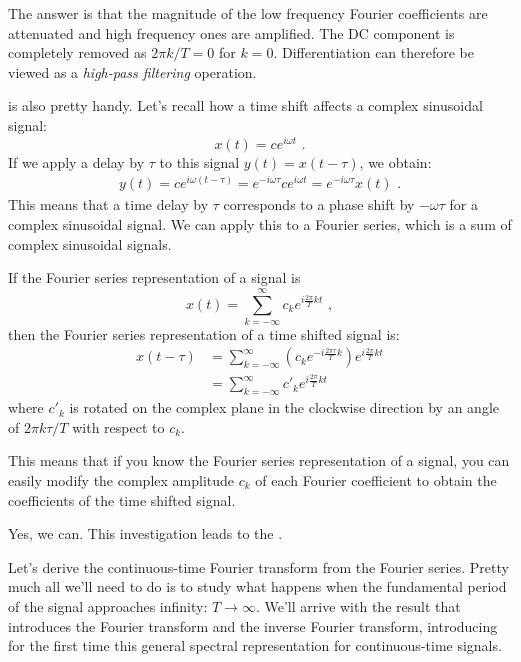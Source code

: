 The answer is that the magnitude of the low frequency Fourier coefficients are attenuated and high frequency ones are amplified. The DC component is completely removed as $2\pi k/T = 0$ for $k=0$. Differentiation can therefore be viewed as a \emph{high-pass filtering} operation.

 is also pretty handy. Let's recall how a time shift affects a complex sinusoidal signal:
\begin{equation}
x(t) = c e^{i\omega t} \,\,.
\end{equation}
If we apply a delay by $\tau$ to this signal $y(t) = x(t-\tau)$, we obtain:
\begin{align}
y(t)  = c e^{i\omega (t-\tau)} =  e^{-i\omega \tau} c e^{i\omega t} = e^{-i\omega \tau} x(t) \,\,.
\end{align}
This means that a time delay by $\tau$ corresponds to a phase shift by $-\omega\tau$ for a complex sinusoidal signal. We can apply this to a Fourier series, which is a sum of complex sinusoidal signals.

If the Fourier series representation of a signal is
\begin{equation}
x(t) = \sum_{k=-\infty}^{\infty} c_k e^{i\frac{2\pi}{T}kt} \,\,,
\end{equation}
then the Fourier series representation of a time shifted signal is:
\begin{align}
x(t-\tau) & = \sum_{k=-\infty}^{\infty} \left(c_k e^{-i \frac{2\pi \tau}{T} k}\right) e^{i\frac{2\pi}{T}kt}\label{eq:time_shift_phasor}\\
          &=  \sum_{k=-\infty}^{\infty} c'_k e^{i\frac{2\pi}{T}kt}
\end{align}
where $c'_k$ is rotated on the complex plane in the clockwise direction by an angle of $2\pi k\tau/T$ with respect to $c_k$.

This means that if you know the Fourier series representation of a signal, you can easily modify the complex amplitude $c_k$ of each Fourier coefficient to obtain the coefficients of the time shifted signal.

 Yes, we can. This investigation leads to the \emph{}.

Let's derive the continuous-time Fourier transform from the Fourier series. Pretty much all we'll need to do is to study what happens when the fundamental period of the signal approaches infinity: $T\rightarrow \infty$.  We'll arrive with the result that introduces the Fourier transform and the inverse Fourier transform, introducing for the first time this general spectral representation for continuous-time signals.

